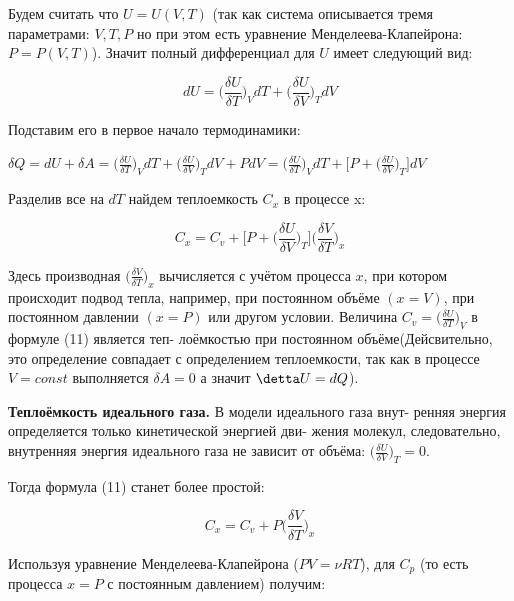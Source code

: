 \documentclass[12pt]{article}
\begin{document}
    Будем считать что $U = U(V,T)$ (так как система описывается тремя параметрами: $V,T,P$ но при этом есть уравнение Менделеева-Клапейрона: $P = P(V,T)$).
    Значит полный дифференциал для $U$ имеет следующий вид:

    \begin{equation}
        dU = \bigg(\frac{\delta U}{\delta T}\bigg)_V dT + \bigg(\frac{\delta U}{\delta V}\bigg)_T dV
    \end{equation}

    Подставим его в первое начало термодинамики:

    $  \delta Q = dU + \delta A =  \bigg(\frac{\delta U}{\delta T}\bigg)_V dT + \bigg(\frac{\delta U}{\delta V}\bigg)_T dV + PdV = \bigg(\frac{\delta U}{\delta T}\bigg)_V dT + \bigg[P + \bigg(\frac{\delta U}{\delta V}\bigg)_T \bigg] dV $

    Разделив все на $dT$ найдем теплоемкость $C_x$ в процессе x:

    \begin{equation}
        C_x = C_v + \bigg[P + \bigg(\frac{\delta U}{\delta V}\bigg)_T \bigg] \bigg(\frac{\delta V}{\delta T}\bigg)_x
    \end{equation}

    Здесь производная $\bigg(\frac{\delta V}{\delta T}\bigg)_x$ вычисляется с учётом процесса $x$, при котором происходит подвод тепла, например, при постоянном объёме $(𝑥 = 𝑉 )$, при постоянном давлении $(𝑥 = 𝑃 )$ или другом условии. Величина $C_v = \bigg(\frac{\delta U}{\delta T}\bigg)_V$ в формуле (11) является теп-
лоёмкостью при постоянном объёме(Дейсвительно, это определение совпадает с определением теплоемкости, так как в процессе $V = const$ выполняется $\delta A = 0$ а значит $\detta U = dQ$).

    \textbf{Теплоёмкость идеального газа.}
    В модели идеального газа внут- ренняя энергия определяется только кинетической энергией дви- жения молекул, следовательно, внутренняя энергия идеального газа не зависит от объёма: $\bigg(\frac{\delta U}{\delta V}\bigg)_T = 0$.

    Тогда формула (11) станет более простой:

    \begin{equation}
        C_x = C_v + P \bigg(\frac{\delta V}{\delta T}\bigg)_x
    \end{equation}

    Используя уравнение Менделеева-Клапейрона ($PV = \nu RT$),
    для $C_p$ (то есть процесса $x = P$ с постоянным давлением) получим:
\end{document}
